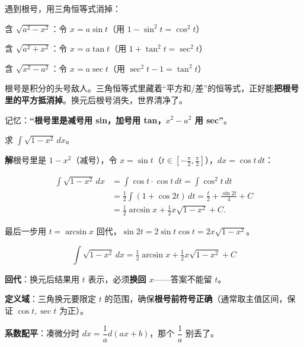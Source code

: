 \documentclass[11pt,a4paper]{article}
\newcommand{\keyw}[1]{\colorbox{cYellowL}{\textbf{\color{cOrange}#1}}}
\begin{document}
\begin{tipbox}
遇到根号，用三角恒等式消掉：
\begin{cndot}
  \item 含 $\sqrt{a^2-x^2}$：令 $x=a\sin t$（用 $1-\sin^2 t=\cos^2 t$）
  \item 含 $\sqrt{a^2+x^2}$：令 $x=a\tan t$（用 $1+\tan^2 t=\sec^2 t$）
  \item 含 $\sqrt{x^2-a^2}$：令 $x=a\sec t$（用 $\sec^2 t-1=\tan^2 t$）
\end{cndot}
\end{tipbox}

\begin{plainbox}[白话解读：三角换元 = “消根号”]
根号是积分的头号敌人。三角恒等式里藏着“平方和/差”的恒等式，正好能\textbf{把根号里的平方抵消掉}。换元后根号消失，世界清净了。

记忆：\keyw{“根号里是减号用 sin，加号用 tan，$x^2-a^2$ 用 sec”}。
\end{plainbox}

\newpage
\begin{egbox}[三角换元]
求 $\displaystyle\int \sqrt{1-x^2}\,dx$。

\textbf{解}\quad 根号里是 $1-x^2$（减号），令 $x=\sin t$（$t\in[-\tfrac{\pi}{2},\tfrac{\pi}{2}]$），$dx=\cos t\,dt$：
\begin{eqbox}\begin{align*}
\int \sqrt{1-x^2}\,dx &= \int \cos t\cdot\cos t\,dt=\int \cos^2 t\,dt\\
  &= \frac{1}{2}\int(1+\cos 2t)\,dt=\frac{t}{2}+\frac{\sin 2t}{4}+C\\
  &= \frac{1}{2}\arcsin x+\frac{1}{2}x\sqrt{1-x^2}+C.
\end{align*}\end{eqbox}
最后一步用 $t=\arcsin x$ 回代，$\sin 2t=2\sin t\cos t=2x\sqrt{1-x^2}$。
\begin{eqbox}\[ \boxed{\int \sqrt{1-x^2}\,dx=\tfrac{1}{2}\arcsin x+\tfrac{1}{2}x\sqrt{1-x^2}+C} \]\end{eqbox}
\end{egbox}

\begin{warnbox}
\begin{pkdot}
  \item \textbf{回代}：换元后结果用 $t$ 表示，必须\keyw{换回 $x$}——答案不能留 $t$。
  \item \textbf{定义域}：三角换元要限定 $t$ 的范围，确保\textbf{根号前符号正确}（通常取主值区间，保证 $\cos t,\sec t$ 为正）。
  \item \textbf{系数配平}：凑微分时 $dx=\dfrac{1}{a}d(ax+b)$，那个 $\dfrac{1}{a}$ 别丢了。
\end{pkdot}
\end{warnbox}
\end{document}
